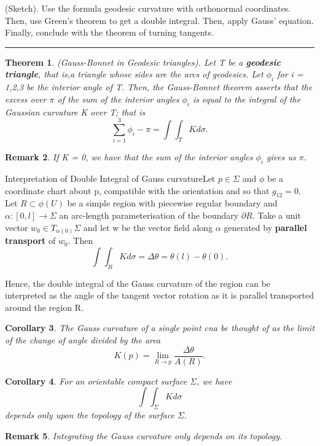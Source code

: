 \documentclass[twoside]{article}
\newcounter{lecnum}
\newtheorem{theorem}{Theorem}[lecnum]
\newtheorem{corollary}[theorem]{Corollary}
\newtheorem{remark}[theorem]{Remark}
\newenvironment{proof}{{\bf Proof:}}{\hfill\rule{2mm}{2mm}}
\begin{document}
\begin{proof}(Sketch). Use the formula geodesic curvature with orthonormal coordinates. Then, use Green's theorem to get a double integral. Then, apply Gauss' equation. Finally, conclude with the theorem of turning tangents.
\end{proof}


\begin{theorem}(Gauss-Bonnet in Geodesic triangles). Let T be a \textbf{geodesic triangle}, that is,a triangle whose sides are the arcs of geodesics. Let $\phi_i$ for i = 1,2,3 be the interior angle of T. Then, the Gauss-Bonnet theorem asserts that the excess over $\pi$ of the sum of the interior angles $\phi_i$ is equal to the integral of the Gaussian curvature K over T; that is 
$$
\sum_{i=1}^{3}\phi_i - \pi = \int \int_T K d\sigma.
$$
\end{theorem}

\begin{remark}If K = 0, we have that the sum of the interior angles $\phi_i$ gives us $\pi.$
\end{remark}

\begin{proposition_exam}{Interpretation of Double Integral of Gauss curvature}{}Let $p \in \Sigma$ and $\phi$ be a coordinate chart about p, compatible with the orientation and so that $g_{12} = 0.$ Let $R \subset \phi(U)$ be a simple region with piecewise regular boundary and $\alpha: [0,l] \rightarrow \Sigma$ an arc-length parameterisation of the boundary $\partial R.$ Take a unit vector $w_0 \in T_{\alpha(0)}\Sigma$ and let w be the vector field along $\alpha$ generated by \textbf{parallel transport} of $w_0.$ Then 
$$
\int \int_RKd\sigma = \Delta \theta = \theta(l) - \theta(0).
$$
\end{proposition_exam}

Hence, the double integral of the Gauss curvature of the region can be interpreted as the angle of the tangent vector rotation as it is parallel transported around the region R.\newline 

\begin{corollary}The Gauss curvature of a single point cna be thought of as the limit of the change of angle divided by the area 
$$
K(p) = \lim_{R \rightarrow p}\frac{\Delta \theta}{A(R)}.
$$
\end{corollary}

\begin{corollary}For an orientable compact surface $\Sigma$, we have 
$$
\int \int_{\Sigma}Kd\sigma
$$
depends only upon the topology of the surface $\Sigma.$
\end{corollary}
\begin{remark}Integrating the Gauss curvature only depends on its topology.
\end{remark}
\end{document}
